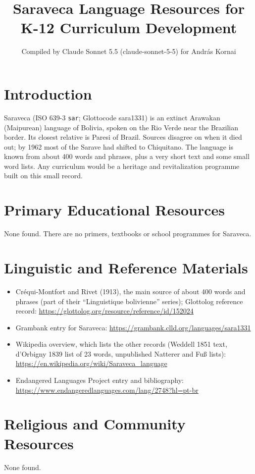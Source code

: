 \documentclass[12pt]{article}
\title{Saraveca Language Resources for K-12 Curriculum Development}
\author{Compiled by Claude Sonnet 5.5 (claude-sonnet-5-5) for Andr\'as Kornai}
\date{}
\begin{document}
\maketitle

\section{Introduction}
Saraveca (ISO 639-3 \texttt{sar}; Glottocode sara1331) is an extinct Arawakan (Maipurean) language of Bolivia, spoken on the Rio Verde near the Brazilian border. Its closest relative is Paresi of Brazil. Sources disagree on when it died out; by 1962 most of the Sarave had shifted to Chiquitano. The language is known from about 400 words and phrases, plus a very short text and some small word lists. Any curriculum would be a heritage and revitalization programme built on this small record.

\section{Primary Educational Resources}
None found. There are no primers, textbooks or school programmes for Saraveca.

\section{Linguistic and Reference Materials}
\begin{itemize}
\item Cr\'equi-Montfort and Rivet (1913), the main source of about 400 words and phrases (part of their ``Linguistique bolivienne'' series); Glottolog reference record: \url{https://glottolog.org/resource/reference/id/152024}
\item Grambank entry for Saraveca: \url{https://grambank.clld.org/languages/sara1331}
\item Wikipedia overview, which lists the other records (Weddell 1851 text, d'Orbigny 1839 list of 23 words, unpublished Natterer and Fu\ss{} lists): \url{https://en.wikipedia.org/wiki/Saraveca_language}
\item Endangered Languages Project entry and bibliography: \url{https://www.endangeredlanguages.com/lang/2748?hl=pt-br}
\end{itemize}

\section{Religious and Community Resources}
None found.
\end{document}
